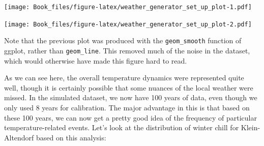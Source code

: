 \documentclass[
]{book}
\newenvironment{Shaded}{\begin{snugshade}}{\end{snugshade}}
\newcommand{\DataTypeTok}[1]{\textcolor[rgb]{0.13,0.29,0.53}{#1}}
\newcommand{\DecValTok}[1]{\textcolor[rgb]{0.00,0.00,0.81}{#1}}
\newcommand{\KeywordTok}[1]{\textcolor[rgb]{0.13,0.29,0.53}{\textbf{#1}}}
\newcommand{\NormalTok}[1]{#1}
\newcommand{\OperatorTok}[1]{\textcolor[rgb]{0.81,0.36,0.00}{\textbf{#1}}}
\newcommand{\StringTok}[1]{\textcolor[rgb]{0.31,0.60,0.02}{#1}}
\begin{document}
\texttt{[image: Book\_files/figure-latex/weather\_generator\_set\_up\_plot-1.pdf]}

\begin{Shaded}
\end{Shaded}

\texttt{[image: Book\_files/figure-latex/weather\_generator\_set\_up\_plot-2.pdf]}

Note that the previous plot was produced with the \texttt{geom\_smooth} function of ggplot, rather than \texttt{geom\_line}. This removed much of the noise in the dataset, which would otherwise have made this figure hard to read.

As we can see here, the overall temperature dynamics were represented quite well, though it is certainly possible that some nuances of the local weather were missed. In the simulated dataset, we now have 100 years of data, even though we only used 8 years for calibration. The major advantage in this is that based on these 100 years, we can now get a pretty good idea of the frequency of particular temperature-related events. Let's look at the distribution of winter chill for Klein-Altendorf based on this analysis:
\end{document}
